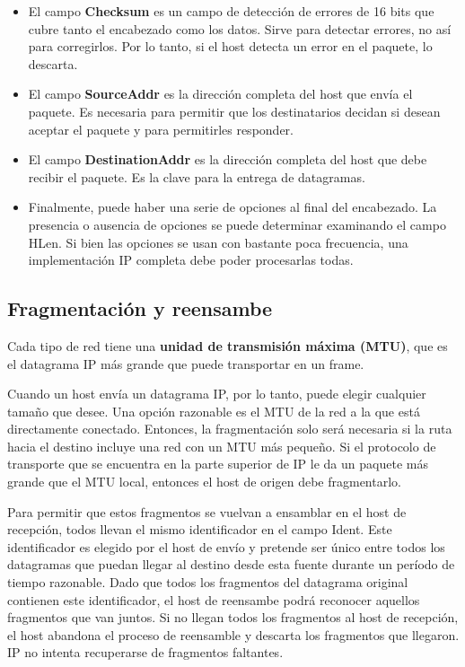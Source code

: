 \begin{itemize}
  \item El campo \textbf{Checksum} es un campo de detección de errores de 16 bits que cubre tanto el encabezado como los datos. Sirve para detectar errores, no así para corregirlos. Por lo tanto, si el host detecta un error en el paquete, lo descarta.
  \item El campo \textbf{SourceAddr} es la dirección completa del host que envía el paquete. Es necesaria para permitir que los destinatarios decidan si desean aceptar el paquete y para permitirles responder.
  \item El campo \textbf{DestinationAddr} es la dirección completa del host que debe recibir el paquete.  Es la clave para la entrega de datagramas.
  \item Finalmente, puede haber una serie de opciones al final del encabezado. La presencia o ausencia de opciones se puede determinar examinando el campo HLen. Si bien las opciones se usan con bastante poca frecuencia, una implementación IP completa debe poder procesarlas todas.
\end{itemize}

\subsection{Fragmentación y reensambe}
Cada tipo de red tiene una \textbf{unidad de transmisión máxima (MTU)}, que es el datagrama IP más grande que puede transportar en un frame.

Cuando un host envía un datagrama IP, por lo tanto, puede elegir cualquier tamaño que desee. Una opción razonable es el MTU de la red a la que está directamente conectado. Entonces, la fragmentación solo será necesaria si la ruta hacia el destino incluye una red con un MTU más pequeño. Si el protocolo de transporte que se encuentra en la parte superior de IP le da un paquete más grande que el MTU local, entonces el host de origen debe fragmentarlo.

Para permitir que estos fragmentos se vuelvan a ensamblar en el host de recepción, todos llevan el mismo identificador en el campo Ident. Este identificador es elegido por el host de envío y pretende ser único entre todos los datagramas que puedan llegar al destino desde esta fuente durante un período de tiempo razonable. Dado que todos los fragmentos del datagrama original contienen este identificador, el host de reensambe podrá reconocer aquellos fragmentos que van juntos. Si no llegan todos los fragmentos al host de recepción, el host abandona el proceso de reensamble y descarta los fragmentos que llegaron. IP no intenta recuperarse de fragmentos faltantes.

